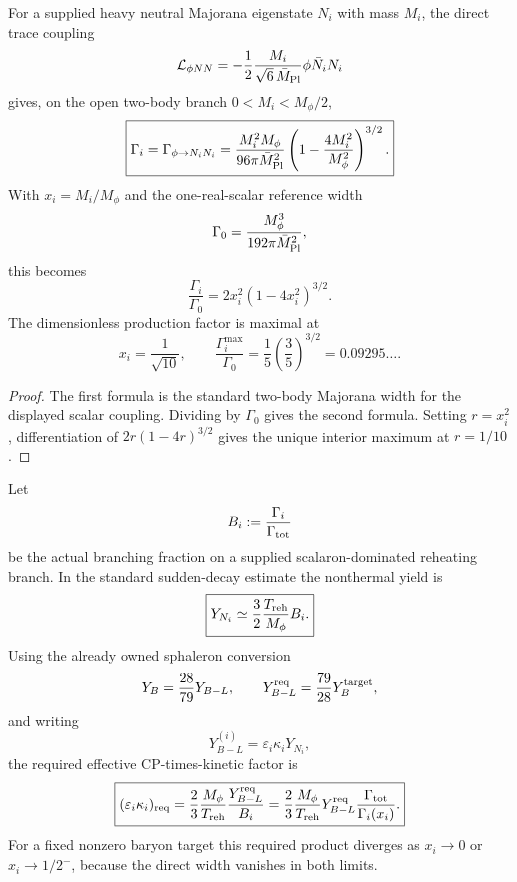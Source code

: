 \documentclass[12pt,a4paper]{article}
\begin{document}
\begin{proposition}
\label{p8:prop:v285-scalaron-majorana-width}
For a supplied heavy neutral Majorana eigenstate \(N_i\) with mass \(M_i\),
the direct trace coupling
\[
 \mathcal L_{\phi NN}
 =-\frac12\frac{M_i}{\sqrt6\,\bar M_{\rm Pl}}
 \phi\bar N_iN_i
\]
gives, on the open two-body branch \(0<M_i<M_\phi/2\),
\[
 \boxed{
 \Gamma_i
 =\Gamma_{\phi\to N_iN_i}
 =\frac{M_i^2M_\phi}{96\pi\bar M_{\rm Pl}^{2}}
 \left(1-\frac{4M_i^2}{M_\phi^2}\right)^{3/2}.}
\]
With \(x_i=M_i/M_\phi\) and the one-real-scalar reference width
\[
 \Gamma_0=\frac{M_\phi^3}{192\pi\bar M_{\rm Pl}^{2}},
\]
this becomes
\[
 \boxed{\frac{\Gamma_i}{\Gamma_0}
 =2x_i^2(1-4x_i^2)^{3/2}.}
\]
The dimensionless production factor is maximal at
\[
 x_i=\frac1{\sqrt{10}},
 \qquad
 \frac{\Gamma_i^{\max}}{\Gamma_0}
 =\frac15\left(\frac35\right)^{3/2}
 =0.09295\ldots .
\]
\end{proposition}

\begin{proof}
The first formula is the standard two-body Majorana width for the displayed
scalar coupling.  Dividing by \(\Gamma_0\) gives the second formula.  Setting
\(r=x_i^2\), differentiation of \(2r(1-4r)^{3/2}\) gives the unique interior
maximum at \(r=1/10\).
\end{proof}

\begin{proposition}
\label{p8:prop:v285-nonthermal-baryogenesis-factor}
Let
\[
 B_i:=\frac{\Gamma_i}{\Gamma_{\rm tot}}
\]
be the actual branching fraction on a supplied scalaron-dominated reheating
branch.  In the standard sudden-decay estimate the nonthermal yield is
\[
 \boxed{
 Y_{N_i}\simeq\frac32\frac{T_{\rm reh}}{M_\phi}B_i.}
\]
Using the already owned sphaleron conversion
\[
 Y_B=\frac{28}{79}Y_{B-L},
 \qquad
 Y_{B-L}^{\rm req}=\frac{79}{28}Y_B^{\rm target},
\]
and writing
\[
 Y_{B-L}^{(i)}=\varepsilon_i\kappa_iY_{N_i},
\]
the required effective CP-times-kinetic factor is
\begin{equation}
\label{p8:eq:v285-required-epsilon-kappa}
 \boxed{
 (\varepsilon_i\kappa_i)_{\rm req}
 =\frac23\frac{M_\phi}{T_{\rm reh}}
   \frac{Y_{B-L}^{\rm req}}{B_i}
 =\frac23\frac{M_\phi}{T_{\rm reh}}Y_{B-L}^{\rm req}
   \frac{\Gamma_{\rm tot}}{\Gamma_i(x_i)}.}
\end{equation}
For a fixed nonzero baryon target this required product diverges as
\(x_i\to0\) or \(x_i\to1/2^-\), because the direct width vanishes in both
limits.
\end{proposition}
\end{document}
